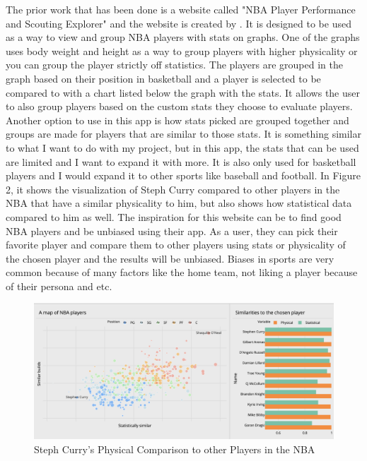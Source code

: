 \documentclass[10pt,twocolumn]{article}
\begin{document}
The prior work that has been done is a website called "NBA Player Performance and Scouting Explorer" and the website is created by \textcite{dash}.
It is designed to be used as a way to view and group NBA players with stats on graphs. One of the graphs uses body weight and height as a way to group players with higher physicality or you can group the player strictly off statistics. The players are grouped in the graph based on their position in basketball and a player is selected to be compared to with a chart listed below the graph with the stats. It allows the user to also group players based on the custom stats they choose to evaluate players. Another option to use in this app is how stats picked are grouped together and groups are made for players that are similar to those stats. It is something similar to what I want to do with my project, but in this app, the stats that can be used are limited and I want to expand it with more. It is also only used for basketball players and I would expand it to other sports like baseball and football. In Figure 2, it shows the visualization of Steph Curry compared to other players in the NBA that have a similar physicality to him, but also shows how statistical data compared to him as well. The inspiration for this website can be to find good NBA players and be unbiased using their app. As a user, they can pick their favorite player and compare them to other players using stats or physicality of the chosen player and the results will be unbiased. Biases in sports are very common because of many factors like the home team, not liking a player because of their persona and etc.

\begin{figure}
    \centering
    \includegraphics[width=.98\linewidth]{Steph_Comparisons.png}
    \caption{
        Steph Curry's Physical Comparison to other Players in the NBA 
    }
    \label{fig:second-page}
\end{figure}
\end{document}
